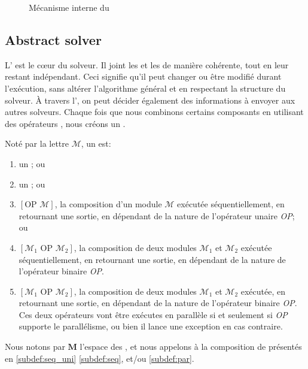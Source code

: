 \begin{figure}
	\centering
	\hspace{0.05\textwidth}%
	\caption[]{Mécanisme interne du \opch}
	\label{fig:ochperform}
\end{figure}%

\subsection{Abstract solver}

L'\as{}  est le c\oe{}ur du solveur. Il joint les \oms{} et les \opchs{} de  manière cohérente, tout en leur restant indépendant. Ceci signifie  qu'il peut changer ou être modifié durant l'exécution, sans altérer  l'algorithme général et en respectant la structure du solveur.  À  travers  l'\as, on peut décider également des informations à envoyer aux autres solveurs. Chaque fois que nous combinons certains composants en utilisant des opérateurs \posl{}, nous créons un \INTROm.

\begin{lemma}
\label{def:cm}
Noté par la lettre $\mathcal{M}$, un {\bf \m} est:
\begin{enumerate}\renewcommand{\labelitemi}{\scriptsize$\blacksquare$}
\item un \om{}; ou
\item un \opch{}; ou
\item $\left[\mbox{OP } \mathcal{M}\right]$, la composition d'un module $\mathcal{M}$ exécutée séquentiellement, en retournant une sortie, en dépendant de la nature de l'opérateur unaire \emph{OP}; ou \label{subdef:seq_uni}
\item $\left[\mathcal{M}_1 \mbox{ OP } \mathcal{M}_2\right]$, la composition de deux modules $\mathcal{M}_1$ et $\mathcal{M}_2$ exécutée séquentiellement, en retournant une sortie, en dépendant de la nature de l'opérateur binaire \emph{OP}.\label{subdef:seq}
\item $\left[\mathcal{M}_1 \mbox{ OP } \mathcal{M}_2\right]$, la composition de deux modules $\mathcal{M}_1$ et $\mathcal{M}_2$ exécutée, en retournant une sortie, en dépendant de la nature de l'opérateur binaire \emph{OP}. Ces deux opérateurs vont être exécutes en parallèle si et seulement si \emph{OP} supporte le parallélisme, ou bien il lance une exception en cas contraire.\label{subdef:par}
\end{enumerate}
Nous notons par $\mathbf{M}$ l'espace des \ms, et nous appelons \cms{} à la composition de \ms{} présentés en \ref{subdef:seq_uni} \ref{subdef:seq}, et/ou \ref{subdef:par}.
\end{lemma}

